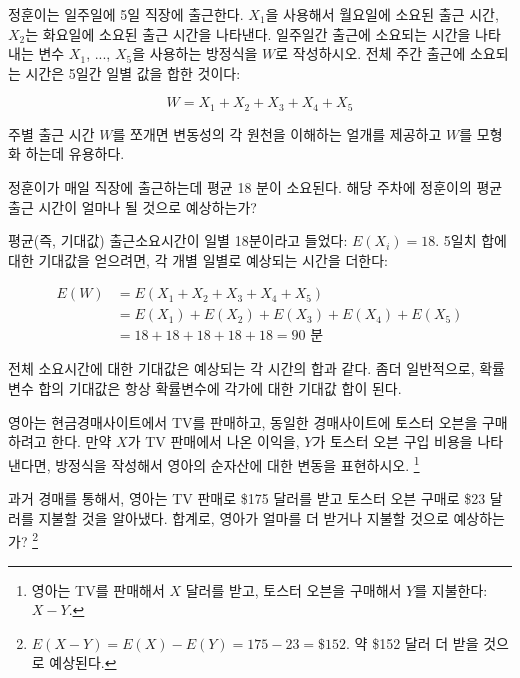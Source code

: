 \begin{example}{정훈이는 일주일에 5일 직장에 출근한다. $X_1$을 사용해서 월요일에 소요된 출근 시간, $X_2$는 화요일에 소요된 출근 시간을 나타낸다. 일주일간 출근에 소요되는 시간을 나타내는 변수 $X_1$, ..., $X_5$을 사용하는 방정식을 $W$로 작성하시오.}
전체 주간 출근에 소요되는 시간은 5일간 일별 값을 합한 것이다:

$$ W = X_1 + X_2 + X_3 + X_4 + X_5 $$

주별 출근 시간 $W$를 쪼개면 변동성의 각 원천을 이해하는 얼개를 제공하고 $W$를 모형화 하는데 유용하다.
\end{example}

\begin{example}{정훈이가 매일 직장에 출근하는데 평균 18 분이 소요된다. 해당 주차에 정훈이의 평균 출근 시간이 얼마나 될 것으로 예상하는가?}

평균(즉, 기대값) 출근소요시간이 일별 18분이라고 들었다: $E(X_i) = 18$. 5일치 합에 대한 기대값을 얻으려면, 각 개별 일별로 예상되는 시간을 더한다:

\begin{align*}
E(W) &= E(X_1 + X_2 + X_3 + X_4 + X_5) \\
	&= E(X_1) + E(X_2) + E(X_3) + E(X_4) + E(X_5) \\
	&= 18 + 18 + 18 + 18 + 18 = 90\text{ 분}
\end{align*}

전체 소요시간에 대한 기대값은 예상되는 각 시간의 합과 같다. 좀더 일반적으로, 확률변수 합의 기대값은 항상 확률변수에 각가에 대한 기대값 합이 된다.
\end{example}

\begin{exercise} \label{elenaIsSellingATVAndBuyingAToasterOvenAtAnAuction}
영아는 현금경매사이트에서 TV를 판매하고, 동일한 경매사이트에 토스터 오븐을 구매하려고 한다. 만약 $X$가 TV 판매에서 나온 이익을, $Y$가 토스터 오븐 구입 비용을 나타낸다면, 방정식을 작성해서 영아의 순자산에 대한 변동을 표현하시오.
\footnote{영아는 TV를 판매해서 $X$ 달러를 받고, 토스터 오븐을 구매해서 $Y$를 지불한다: $X-Y$.}
\end{exercise}

\begin{exercise}
과거 경매를 통해서, 영아는 TV 판매로 \$175 달러를 받고 토스터 오븐 구매로 \$23 달러를 지불할 것을 알아냈다. 합계로, 영아가 얼마를 더 받거나 지불할 것으로 예상하는가?
\footnote{$E(X-Y) = E(X) - E(Y) = 175 - 23 = \$152$. 약 \$152 달러 더 받을 것으로 예상된다.}
\end{exercise}

